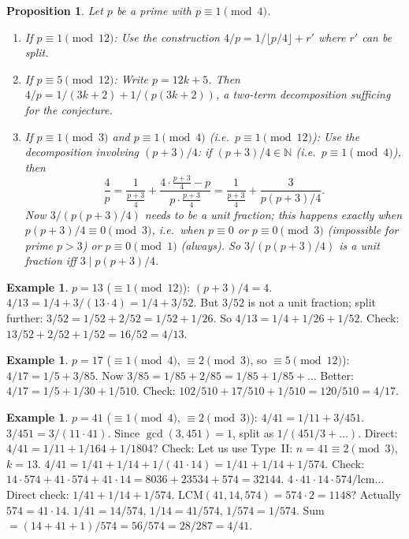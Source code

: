 \documentclass[12pt,a4paper]{amsart}
\newtheorem{proposition}[theorem]{Proposition}
\theoremstyle{definition}
\newtheorem{example}[theorem]{Example}
\newcommand{\N}{\mathbb{N}}
\begin{document}
\begin{proposition}\label{prop:mod-cases}
Let $p$ be a prime with $p \equiv 1 \pmod 4$.
\begin{enumerate}[label=(\roman*)]
\item If $p \equiv 1 \pmod{12}$: Use the construction
      $4/p = 1/\lfloor p/4 \rfloor + r'$ where $r'$ can be split.
\item If $p \equiv 5 \pmod{12}$: Write $p = 12k + 5$. Then
      $4/p = 1/(3k+2) + 1/(p(3k+2))$,
      a two-term decomposition sufficing for the conjecture.
\item If $p \equiv 1 \pmod 3$ and $p \equiv 1 \pmod 4$
      (i.e.\ $p \equiv 1 \pmod{12}$):
      Use the decomposition involving $(p+3)/4$:
      if $(p+3)/4 \in \N$ (i.e.\ $p \equiv 1 \pmod 4$), then
      \[
        \frac{4}{p} = \frac{1}{\frac{p+3}{4}} + \frac{4 \cdot \frac{p+3}{4} - p}{p \cdot \frac{p+3}{4}}
                    = \frac{1}{\frac{p+3}{4}} + \frac{3}{p(p+3)/4}.
      \]
      Now $3/(p(p+3)/4)$ needs to be a unit fraction; this happens exactly
      when $p(p+3)/4 \equiv 0 \pmod 3$, i.e.\ when $p \equiv 0$ or $p \equiv 0 \pmod 3$
      (impossible for prime $p > 3$) or $p \equiv 0 \pmod 1$ (always). So
      $3/(p(p+3)/4)$ is a unit fraction iff $3 \mid p(p+3)/4$.
\end{enumerate}
\end{proposition}

\begin{example}
$p = 13$ ($\equiv 1 \pmod{12}$): $(p+3)/4 = 4$.
$4/13 = 1/4 + 3/(13 \cdot 4) = 1/4 + 3/52$.
But $3/52$ is not a unit fraction; split further:
$3/52 = 1/52 + 2/52 = 1/52 + 1/26$.
So $4/13 = 1/4 + 1/26 + 1/52$.
Check: $13/52 + 2/52 + 1/52 = 16/52 = 4/13$. \checkmark
\end{example}

\begin{example}
$p = 17$ ($\equiv 1 \pmod 4$, $\equiv 2 \pmod 3$, so $\equiv 5 \pmod{12}$):
$4/17 = 1/5 + 3/85$. Now $3/85 = 1/85 + 2/85 = 1/85 + 1/85 + \ldots$
Better: $4/17 = 1/5 + 1/30 + 1/510$.
Check: $102/510 + 17/510 + 1/510 = 120/510 = 4/17$. \checkmark
\end{example}

\begin{example}
$p = 41$ ($\equiv 1 \pmod 4$, $\equiv 2 \pmod 3$): $4/41 = 1/11 + 3/451$.
$3/451 = 3/(11 \cdot 41)$. Since $\gcd(3, 451) = 1$, split as
$1/(451/3 + \ldots)$. Direct: $4/41 = 1/11 + 1/164 + 1/1804$?
Check: Let us use Type~II: $n = 41 \equiv 2 \pmod 3$, $k = 13$.
$4/41 = 1/41 + 1/14 + 1/(41 \cdot 14) = 1/41 + 1/14 + 1/574$.
Check: $14 \cdot 574 + 41 \cdot 574 + 41 \cdot 14 = 8036 + 23534 + 574 = 32144$.
$4 \cdot 41 \cdot 14 \cdot 574 / \text{lcm} \ldots$
Direct check: $1/41 + 1/14 + 1/574$.
LCM$(41, 14, 574) = 574 \cdot 2 = 1148$? Actually $574 = 41 \cdot 14$.
$1/41 = 14/574$, $1/14 = 41/574$, $1/574 = 1/574$.
Sum $= (14 + 41 + 1)/574 = 56/574 = 28/287 = 4/41$. \checkmark
\end{example}
\end{document}
